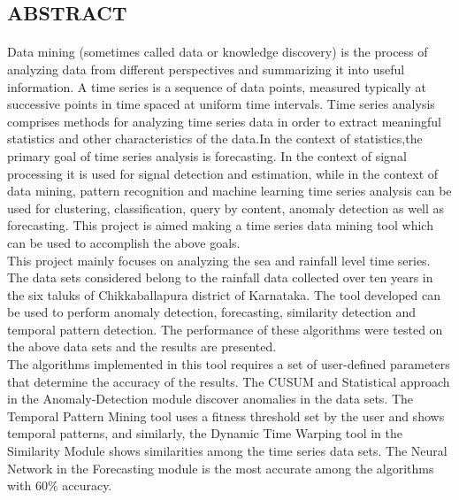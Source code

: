\documentclass[12pt,a4paper]{report}
\begin{document}
\begin{center}
\section*{ABSTRACT}
\end{center} 

\paragraph{}  Data mining (sometimes called data or knowledge discovery) is the process of analyzing data from different perspectives and summarizing it into useful information. A time series is a sequence of data points, measured typically at successive points in time spaced at uniform time intervals. Time series analysis comprises methods for analyzing time series data in order to extract meaningful statistics and other characteristics of the data.In the context of statistics,the primary goal of time series analysis is forecasting. In the context of signal processing it is used for signal detection and estimation, while in the context of data mining, pattern recognition and machine learning time series analysis can be used for clustering, classification, query by content, anomaly detection as well as forecasting. This project is aimed making a time series data mining tool which can be used to accomplish the above goals. \\



This project mainly focuses on analyzing the sea and rainfall level time series. The data sets considered belong to the  rainfall data collected over ten years in the six taluks of Chikkaballapura district of Karnataka.
The tool developed can be used to perform anomaly detection, forecasting, similarity detection and temporal pattern detection. The performance of these algorithms were tested on the above data sets and the results are presented.  \\



The algorithms implemented in this tool requires a set of user-defined parameters that determine the accuracy of the results. The CUSUM and Statistical approach in the Anomaly-Detection module discover anomalies in the data sets. The Temporal Pattern Mining tool uses a fitness threshold set by the user and shows temporal patterns, and similarly, the Dynamic Time Warping tool in the Similarity Module shows similarities among the time series data sets. The Neural Network in the Forecasting module is the most accurate among the algorithms with 60\% accuracy. 
\end{document}
